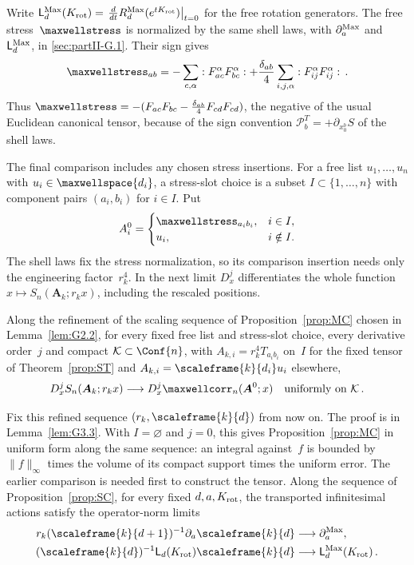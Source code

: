 Write $\mathsf L_d^{\rm Max}(K_{\rm rot})=\left.\frac{d}{dt}R_d^{\rm Max}(e^{tK_{\rm rot}})\right|_{t=0}$ for the free rotation generators. The free stress~$\maxwellstress$ is normalized by the same shell laws, with $\partial_a^{\rm Max}$ and $\mathsf L_d^{\rm Max}$, in \ref{sec:partII-G.1}. Their sign gives
\begin{equation*}
\maxwellstress_{ab}=-\sum_{c,\alpha}:F_{ac}^\alpha F_{bc}^\alpha:
+\frac{\delta_{ab}}4\sum_{i,j,\alpha}:F_{ij}^\alpha F_{ij}^\alpha:\,.
\end{equation*}
Thus $\maxwellstress=-(F_{ac}F_{bc}-\tfrac{\delta_{ab}}4F_{cd}F_{cd})$, the negative of the usual Euclidean canonical tensor, because of the sign convention $\mathcal P_b^T=+\partial_{x_0^b}S$ of the shell laws.

The final comparison includes any chosen stress insertions. For a free list $u_1,\ldots,u_n$ with $u_i\in\maxwellspace{d_i}$, a stress-slot choice is a subset $I\subset\{1,\ldots,n\}$ with component pairs $(a_i,b_i)$ for $i\in I$. Put
\begin{equation*}
A_i^0=\begin{cases}\maxwellstress_{a_ib_i},&i\in I,\\u_i,&i\notin I.\end{cases}
\end{equation*}
The shell laws fix the stress normalization, so its comparison insertion needs only the engineering factor~$r_k^4$. In the next limit $D_x^j$ differentiates the whole function $x\mapsto S_n(\boldsymbol A_k;r_kx)$, including the rescaled positions.
\begin{proposition}\label{prop:SC}
Along the refinement of the scaling sequence of Proposition~\ref{prop:MC} chosen in Lemma~\ref{lem:G2.2}, for every fixed free list and stress-slot choice, every derivative order~$j$ and compact $\mathcal K\subset\Conf{n}$, with $A_{k,i}=r_k^4T_{a_ib_i}$ on~$I$ for the fixed tensor of Theorem~\ref{prop:ST} and $A_{k,i}=\scaleframe{k}{d_i}u_i$ elsewhere,
\begin{equation*}
D_x^jS_n(\boldsymbol A_k;r_kx)\longrightarrow D_x^j\maxwellcorr_n(\boldsymbol A^0;x)
\quad\text{uniformly on }\mathcal K\,.
\end{equation*}
\end{proposition}
Fix this refined sequence $(r_k,\scaleframe{k}{d})$ from now on.
The proof is in Lemma~\ref{lem:G3.3}. With $I=\varnothing$ and $j=0$, this gives Proposition~\ref{prop:MC} in uniform form along the same sequence: an integral against~$f$ is bounded by $\|f\|_\infty$ times the volume of its compact support times the uniform error. The earlier comparison is needed first to construct the tensor. Along the sequence of Proposition~\ref{prop:SC}, for every fixed $d,a,K_{\rm rot}$, the transported infinitesimal actions satisfy the operator-norm limits
\begin{align*}
r_k(\scaleframe{k}{d+1})^{-1}\partial_a\scaleframe{k}{d}&\longrightarrow\partial_a^{\rm Max},\\
(\scaleframe{k}{d})^{-1}\mathsf L_d(K_{\rm rot})\scaleframe{k}{d}&\longrightarrow\mathsf L_d^{\rm Max}(K_{\rm rot})\,.
\end{align*}
